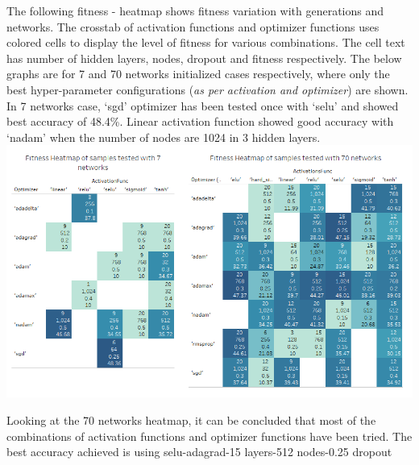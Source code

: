 \documentclass[]{article}
\begin{document}
The following fitness - heatmap shows fitness variation with generations
and networks. The crosstab of activation functions and optimizer
functions uses colored cells to display the level of fitness for various
combinations. The cell text has number of hidden layers, nodes, dropout
and fitness respectively. The below graphs are for 7 and 70 networks
initialized cases respectively, where only the best hyper-parameter
configurations (\emph{as per activation and optimizer}) are shown. In 7
networks case, `sgd' optimizer has been tested once with `selu' and
showed best accuracy of 48.4\%. Linear activation function showed good
accuracy with `nadam' when the number of nodes are 1024 in 3 hidden
layers. \includegraphics{./Images/HeatMap.png}

Looking at the 70 networks heatmap, it can be concluded that most of the
combinations of activation functions and optimizer functions have been
tried. The best accuracy achieved is using selu-adagrad-15 layers-512
nodes-0.25 dropout
\end{document}
